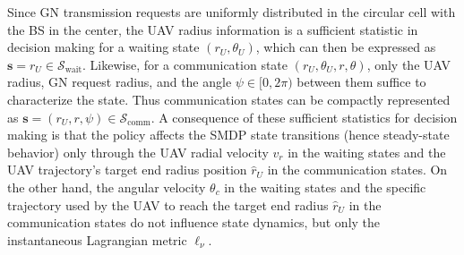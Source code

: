 \documentclass[12pt, draftcls, onecolumn]{IEEEtran}
\theoremstyle{plain}
\theoremstyle{definition}
\theoremstyle{remark}
\begin{document}
Since GN transmission requests are uniformly distributed in the circular cell with the BS in the center, the UAV radius information is a sufficient statistic in decision making for a {waiting} state $(r_{U},\theta_{U})$, which can then be expressed as $\mathbf{s}{=}r_{U}{\in}\mathcal{S}_{\mathrm{wait}}$. Likewise, for a {communication} state $(r_{U},\theta_{U},r,\theta)$, only the UAV radius, GN request radius, and the angle $\psi{\in}[0,2\pi)$ between them suffice to characterize the state. Thus {communication} states can be compactly represented as $\mathbf{s}{=}(r_{U},r,\psi){\in}\mathcal{S}_{\mathrm{comm}}$. A consequence of these sufficient statistics for decision making is that the policy affects the SMDP state transitions (hence steady-state behavior) only through the UAV radial velocity $v_{r}$ in the {waiting} states and the UAV trajectory's target end radius position $\hat{r}_{U}$ in the {communication} states. On the other hand, the angular velocity $\theta_{c}$ in the {waiting} states and the
specific trajectory used by the UAV to reach the target end radius $\hat{r}_{U}$ in the {communication} states do not influence state dynamics, but only the instantaneous Lagrangian metric $\ell_{\nu}$. 
\end{document}
